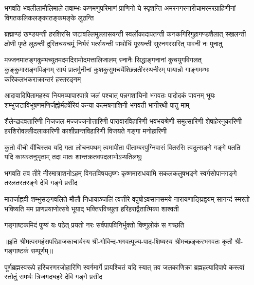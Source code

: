 

\fourlineindentedshloka
{भगवति भवलीलामौलिमाले तवाम्भः}
{कणमणुपरिमाणं प्राणिनो ये स्पृशन्ति}
{अमरनगरनारीचामरमरग्राहिणीनां}
{विगतकलिकलङ्कातङ्कमङ्के लुठन्ति}%

\fourlineindentedshloka
{ब्रह्माण्डं खण्डयन्ती हरशिरसि जटावल्लिमुल्लासयन्ती}
{स्वर्लोकादापतन्ती कनकगिरिगुहागण्डशैलात् स्खलन्ती}
{क्षोणी पृष्ठे लुठन्ती दुरितचयचमूं निर्भरं भर्त्सयन्ती}
{पाथोधिं पूरयन्ती सुरनगरसरित् पावनी नः पुनातु}%

\fourlineindentedshloka
{मज्जनमातङ्गकुम्भच्युतमदमदिरामोदमत्तालिजालम्}
{स्नानैः सिद्धाङ्गनानां कुचयुगविगलत् कुङ्कुमासङ्गपिङ्गम्}
{सायं प्रातर्मुनीनां कुशकुसुमचयैश्छिन्नतीरस्थनीरम्}
{पायान्नो गाङ्गमम्भः करिकलभकराक्रान्तरं हस्तरङ्गम्}%

\fourlineindentedshloka
{आदावादिपितामहस्य नियमव्यापारपात्रे जलं}
{पश्चात् पन्नगशायिनो भगवतः पादोदकं पावनम्}
{भूयः शम्भुजटाविभूषणमणिर्जह्नोर्महर्षेरियं}
{कन्या कल्मषनाशिनी भगवती भागीरथी पातु माम्}%

\fourlineindentedshloka
{शैलेन्द्रादवतारिणी निजजल-मज्जज्जनोत्तारिणी}
{पारावारविहारिणी भवभयश्रेणी-समुत्सारिणी}
{शेषाहेरनुकारिणी हरशिरोवल्लीदलाकारिणी}
{काशीप्रान्तविहारिणी विजयते गङ्गा मनोहारिणी}%

\fourlineindentedshloka
{कुतो वीची वीचिस्तव यदि गता लोचनपथम्}
{त्वमापीता पीताम्बरपुग्निवासं वितरसि}
{त्वदुत्सङ्गे गङ्गे पतति यदि कायस्तनुभृताम्}
{तदा मातः शान्तक्रतवपदलाभोऽप्यतिलघुः}%

\fourlineindentedshloka
{भगवति तव तीरे नीरमात्राशनोऽहम्}
{विगतविषयतृष्णः कृष्णमाराधयामि}
{सकलकलुषभङ्गे स्वर्गसोपानगङ्गे}
{तरलतरतरङ्गे देवि गङ्गे प्रसीद}%

\fourlineindentedshloka
{मातर्जाह्नवी शम्भुसङ्गवलिते मौलौ निधायाञ्जलिं}
{त्वत्तीरे वपुषोऽवसानसमये नारायणाङ्घ्रिद्वयम्}
{सानन्दं स्मरतो भविष्यति मम प्राणप्रयाणोत्सवे}
{भूयाद् भक्तिरविच्युता हरिहराद्वैतात्मिका शाश्वती}%

\twolineshloka
{गङ्गाष्टकमिदं पुण्यं यः पठेत् प्रयतो नरः}
{सर्वपापविनिर्भुक्तो विष्णुलोकं स गच्छति}%


॥इति श्रीमत्परमहंसपरिव्राजकाचार्यस्य श्री-गोविन्द-भगवत्पूज्य-पाद-शिष्यस्य 
श्रीमच्छङ्करभगवतः कृतौ श्री-गङ्गाष्टकं सम्पूर्णम्॥

{पूर्णब्रह्मस्वरूपे हरिचरणरजोहारिणि स्वर्गमार्गे}
{प्रायश्चितं यदि स्यात् तव जलकाणिक्रा ब्रह्महत्यादिपापे}
{कस्त्वां स्तोतुं समर्थः त्रिजगदघहरे देवि गङ्गे प्रसीद}%